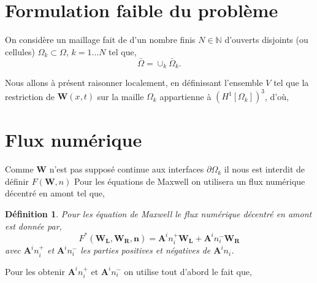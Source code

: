 \documentclass[a4paper,oneside,10pt]{report}
\newtheorem{mydef}{Définition}
\begin{document}
\section{Formulation faible du problème}

On considère un maillage fait de d'un nombre finis $N\in \mathbb{N}$ d'ouverts disjoints (ou cellules) $\Omega_k \subset \Omega$, $k=1\dots N$ tel que,
\begin{equation}
\bar{\Omega} = \cup_k \bar{\Omega}_k.
\end{equation}

Nous allons à présent raisonner localement, en définissant l'ensemble $V$ tel que la restriction de $\mathbf{W}(x,t)$ sur la maille $\Omega_k$ appartienne à $(H^1[\Omega_k])^3$, d'où,




\section{Flux numérique}
Comme $\mathbf{W}$ n'est pas supposé continue aux interfaces $\partial \Omega_k$ il nous est interdit de définir $F(\mathbf{W},n)$
Pour les équations de Maxwell on utilisera un flux numérique décentré en amont tel que,





\begin{mydef}
Pour les équation de Maxwell le flux numérique décentré en amont est donnée par,
\begin{equation}
\label{eq:fluxnum}
F^*(\mathbf{W_L},\mathbf{W_R},\mathbf{n}) = \mathbf{A}^i n_i^+\mathbf{W_L} + \mathbf{A}^i n_i^-\mathbf{W_R}
\end{equation}
avec $\mathbf{A}^i n_i^+$ et $\mathbf{A}^i n_i^-$ les parties positives et négatives de $\mathbf{A}^i n_i$.
\end{mydef}

Pour les obtenir $\mathbf{A}^i n_i^+$ et $\mathbf{A}^i n_i^-$ on utilise tout d'abord le fait que, 
\end{document}
